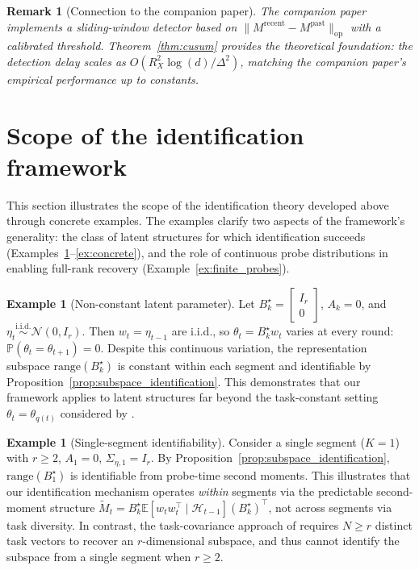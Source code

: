 \documentclass[12pt]{article}
\newcommand{\E}{\mathbb{E}}
\newcommand{\Prob}{\mathbb{P}}
\newcommand{\op}{\mathrm{op}}
\newcommand{\cH}{\mathcal{H}}
\newcommand{\range}{\mathrm{range}}
\newcommand{\bbm}{\begin{bmatrix}}
\newcommand{\ebm}{\end{bmatrix}}
\newtheorem{remark}{Remark}
\theoremstyle{plain}
\theoremstyle{definition}
\newtheorem{example}[theorem]{Example}
\begin{document}
\begin{remark}[Connection to the companion paper]
The companion paper implements a sliding-window detector based on $\|M^{\mathrm{recent}} - M^{\mathrm{past}}\|_{\op}$ with a calibrated threshold. Theorem~\ref{thm:cusum} provides the theoretical foundation: the detection delay scales as $O(R_X^2\log(d)/\Delta^2)$, matching the companion paper's empirical performance up to constants.
\end{remark}


\section{Scope of the identification framework}
\label{sec:separations}

This section illustrates the scope of the identification theory developed above through concrete examples. The examples clarify two aspects of the framework's generality: the class of latent structures for which identification succeeds (Examples~\ref{ex:iid_latent}--\ref{ex:concrete}), and the role of continuous probe distributions in enabling full-rank recovery (Example~\ref{ex:finite_probes}).

\begin{example}[Non-constant latent parameter]
\label{ex:iid_latent}
Let $B_k^\star = \bbm I_r \\ 0 \ebm$, $A_k = 0$, and $\eta_t \stackrel{\mathrm{i.i.d.}}{\sim} \mathcal{N}(0, I_r)$. Then $w_t = \eta_{t-1}$ are i.i.d., so $\theta_t = B_k^\star w_t$ varies at every round: $\Prob(\theta_t = \theta_{t+1}) = 0$. Despite this continuous variation, the representation subspace $\range(B_k^\star)$ is constant within each segment and identifiable by Proposition~\ref{prop:subspace_identification}. This demonstrates that our framework applies to latent structures far beyond the task-constant setting $\theta_t = \theta_{q(t)}$ considered by \citet{qin2022nonstationary}.
\end{example}

\begin{example}[Single-segment identifiability]
\label{ex:single_segment}
Consider a single segment ($K = 1$) with $r \ge 2$, $A_1 = 0$, $\Sigma_{\eta,1} = I_r$. By Proposition~\ref{prop:subspace_identification}, $\range(B_1^\star)$ is identifiable from probe-time second moments. This illustrates that our identification mechanism operates \emph{within} segments via the predictable second-moment structure $\widetilde{M}_t = B_k^\star \E[w_t w_t^\top \mid \cH_{t-1}] (B_k^\star)^\top$, not across segments via task diversity. In contrast, the task-covariance approach of \citet{qin2022nonstationary} requires $N \ge r$ distinct task vectors to recover an $r$-dimensional subspace, and thus cannot identify the subspace from a single segment when $r \ge 2$.
\end{example}
\end{document}
